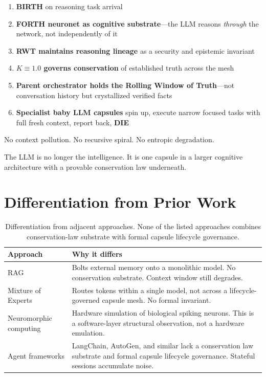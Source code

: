 \documentclass[11pt]{article}
\begin{document}
\begin{enumerate}
  \item \textbf{BIRTH} on reasoning task arrival
  \item \textbf{FORTH neuronet as cognitive substrate}---the LLM reasons
        \emph{through} the network, not independently of it
  \item \textbf{RWT maintains reasoning lineage} as a security and
        epistemic invariant
  \item \textbf{$K \equiv 1.0$ governs conservation} of established
        truth across the mesh
  \item \textbf{Parent orchestrator holds the Rolling Window of Truth}---not
        conversation history but crystallized verified facts
  \item \textbf{Specialist baby LLM capsules} spin up, execute narrow
        focused tasks with full fresh context, report back, \textbf{DIE}
\end{enumerate}

No context pollution. No recursive spiral. No entropic degradation.

The LLM is no longer the intelligence. It is one capsule in a larger
cognitive architecture with a provable conservation law underneath.

\section{Differentiation from Prior Work}

\begin{table}[h]
\centering
\begin{tabular}{@{}lp{9cm}@{}}
\toprule
\textbf{Approach} & \textbf{Why it differs} \\
\midrule
RAG &
  Bolts external memory onto a monolithic model. No conservation substrate.
  Context window still degrades. \\
Mixture of Experts &
  Routes tokens within a single model, not across a lifecycle-governed
  capsule mesh. No formal invariant. \\
Neuromorphic computing &
  Hardware simulation of biological spiking neurons. This is a
  software-layer structural observation, not a hardware emulation. \\
Agent frameworks &
  LangChain, AutoGen, and similar lack a conservation law substrate and
  formal capsule lifecycle governance. Stateful sessions accumulate noise. \\
\bottomrule
\end{tabular}
\caption{Differentiation from adjacent approaches. None of the listed
         approaches combines conservation-law substrate with formal capsule
         lifecycle governance.}
\end{table}
\end{document}

